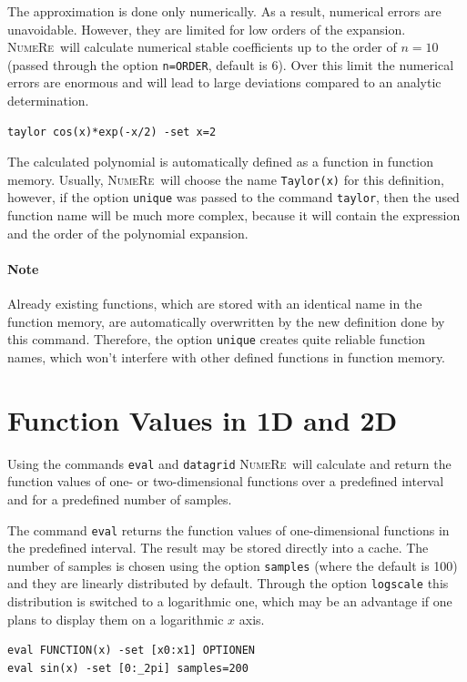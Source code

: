 \documentclass[DIV=14,headsepline,footsepline]{scrbook}
\newcommand{\NR}{\textsc{Nu\-me\-Re}}
\begin{document}
				The approximation is done only numerically. As a result, numerical errors are unavoidable. However, they are limited for low orders of the expansion. \NR\ will calculate numerical stable coefficients up to the order of $n = 10$ (passed through the option \lstinline+n=ORDER+, default is 6). Over this limit the numerical errors are enormous and will lead to large deviations compared to an analytic determination.
				\begin{lstlisting}
taylor cos(x)*exp(-x/2) -set x=2
				\end{lstlisting}
				
				The calculated polynomial is automatically defined as a function in function memory. Usually, \NR\ will choose the name \lstinline+Taylor(x)+ for this definition, however, if the option \lstinline+unique+ was passed to the command \lstinline+taylor+, then the used function name will be much more complex, because it will contain the expression and the order of the polynomial expansion.
				\paragraph{Note} Already existing functions, which are stored with an identical name in the function memory, are automatically overwritten by the new definition done by this command. Therefore, the option \lstinline+unique+ creates quite reliable function names, which won't interfere with other defined functions in function memory.
				
			\section{Function Values in 1D and 2D} %
				Using the commands \lstinline+eval+ and \lstinline+datagrid+ \NR\ will calculate and return the function values of one- or two-dimensional functions over a predefined interval and for a predefined number of samples.
				
				The command \lstinline+eval+ returns the function values of one-dimensional functions in the predefined interval. The result may be stored directly into a cache. The number of samples is chosen using the option \lstinline+samples+ (where the default is 100) and they are linearly distributed by default. Through the option \lstinline+logscale+ this distribution is switched to a logarithmic one, which may be an advantage if one plans to display them on a logarithmic $x$ axis.
				\begin{lstlisting}
eval FUNCTION(x) -set [x0:x1] OPTIONEN
eval sin(x) -set [0:_2pi] samples=200
				\end{lstlisting}
				
\end{document}
